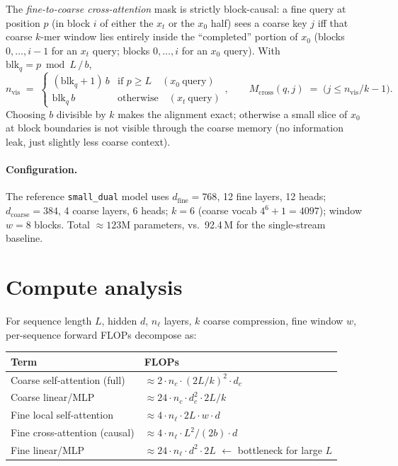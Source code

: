 \documentclass[11pt,a4paper]{article}
\begin{document}
The \emph{fine-to-coarse cross-attention} mask is strictly block-causal: a
fine query at position \(p\) (in block \(i\) of either the \(x_t\) or the
\(x_0\) half) sees a coarse key \(j\) iff that coarse \(k\)-mer window lies
entirely inside the ``completed'' portion of \(x_0\)
(blocks \(0,\dots,i-1\) for an \(x_t\) query;
blocks \(0,\dots,i\) for an \(x_0\) query). With
\(\mathrm{blk}_q = p\bmod L \,/\, b\),
\[
n_{\text{vis}} \;=\;
\begin{cases}
   (\mathrm{blk}_q + 1)\,b & \text{if } p \ge L \quad(x_0\ \text{query}) \\
   \mathrm{blk}_q\,b       & \text{otherwise} \quad (x_t\ \text{query})
\end{cases},
\qquad
M_{\text{cross}}(q,j) \;=\; \big(j \le n_{\text{vis}}/k - 1\big).
\]
Choosing \(b\) divisible by \(k\) makes the alignment exact; otherwise a small
slice of \(x_0\) at block boundaries is not visible through the coarse memory
(no information leak, just slightly less coarse context).

\paragraph{Configuration.} The reference \texttt{small\_dual} model uses
\(d_{\text{fine}}\!=\!768\), 12 fine layers, 12 heads;
\(d_{\text{coarse}}\!=\!384\), 4 coarse layers, 6 heads; \(k\!=\!6\)
(coarse vocab \(4^{6}+1 = 4097\)); window \(w=8\) blocks. Total
\(\approx 123\)M parameters, vs.\ 92.4\,M for the single-stream baseline.

\section{Compute analysis}

For sequence length \(L\), hidden \(d\), \(n_\ell\) layers, \(k\) coarse
compression, fine window \(w\), per-sequence forward FLOPs decompose as:

\begin{table}[h]
\centering
\small
\begin{tabular}{l l}
\toprule
\textbf{Term} & \textbf{FLOPs} \\
\midrule
Coarse self-attention (full) & \(\approx 2 \cdot n_{c}\cdot (2L/k)^2 \cdot d_c\) \\
Coarse linear/MLP            & \(\approx 24\cdot n_{c}\cdot d_c^2 \cdot 2L/k\) \\
Fine local self-attention    & \(\approx 4 \cdot n_\ell \cdot 2L \cdot w \cdot d\) \\
Fine cross-attention (causal)& \(\approx 4 \cdot n_\ell \cdot L^2/(2b) \cdot d\) \\
Fine linear/MLP              & \(\approx 24\cdot n_\ell \cdot d^2 \cdot 2L\) \quad \(\leftarrow\) bottleneck for large \(L\) \\
\bottomrule
\end{tabular}
\end{table}
\end{document}
